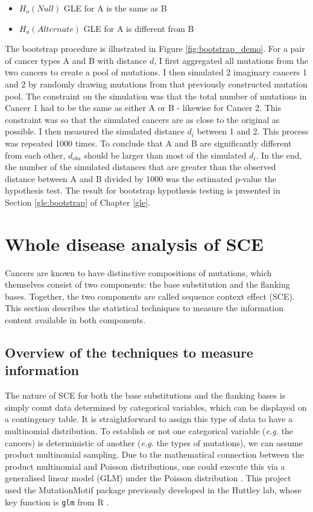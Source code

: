 \newpage
\begin{itemize}
    \item $H_o (Null)$ GLE for A is the same as B
    \item $H_a (Alternate)$ GLE for A is different from B
\end{itemize}

The bootstrap procedure is illustrated in Figure \ref{fig:bootstrap_demo}. For a pair of cancer types A and B with distance $d$, I first aggregated all mutations from the two cancers to create a pool of mutations. I then simulated 2 imaginary cancers 1 and 2 by randomly drawing mutations from that previously constructed mutation pool. The constraint on the simulation was that the total number of mutations in Cancer 1 had to be the same as either A or B - likewise for Cancer 2. This constraint was so that the simulated cancers are as close to the original as possible. I then measured the simulated distance $d_i$ between 1 and 2. This process was repeated 1000 times. To conclude that A and B are significantly different from each other, $d_{obs}$ should be larger than most of the simulated $d_i$. In the end, the number of the simulated distances that are greater than the observed distance between A and B divided by 1000 was the estimated p-value the hypothesis test. The result for bootstrap hypothesis testing is presented in Section \ref{gle:bootstrap} of Chapter \ref{gle}.



\section{Whole disease analysis of SCE}\label{methods:sce}
Cancers are known to have distinctive compositions of mutations, which themselves consist of two components: the base substitution and the flanking bases. Together, the two components are called sequence context effect (SCE). This section describes the statistical techniques  to measure the information content available in both components.

\subsection{Overview of the techniques to measure information}
The nature of SCE for both the base substitutions and the flanking bases is simply count data determined by categorical variables, which can be displayed on a contingency table. It is straightforward to assign this type of data to have a multinomial distribution. To establish or not one categorical variable (\textit{e.g.} the cancers) is deterministic of another (\textit{e.g.} the types of mutations), we can assume product multinomial sampling. Due to the mathematical connection between the product multinomial and Poisson distributions, one could execute this  via a generalised linear model (GLM) under the Poisson distribution \citep{Nelder1974LOGSQUARES.}. This project used the MutationMotif package previously developed in the Huttley lab, whose key function is \texttt{glm} from R \citep{Zhu2017}.

